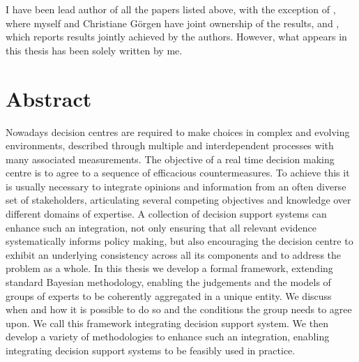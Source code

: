 \documentclass[11pt, oneside]{Thesis} %
\begin{document}
I have been lead author of all the papers listed above, with the exception of \citet{Gorgen2015}, where myself and Christiane G\"{o}rgen have joint ownership of the results, and \citet{Smith2015}, which reports results jointly achieved by the authors. However, what appears in this thesis has been solely written by me.   
\clearpage 

\chapter*{Abstract}
\thispagestyle{empty}
Nowadays decision centres are required to make choices in complex and evolving environments, described through multiple and interdependent processes with many associated measurements. The objective of a real time decision making centre is to agree to a sequence of efficacious countermeasures. To achieve this it is usually necessary to integrate opinions and information from an often diverse set of stakeholders, articulating several competing objectives and knowledge over different domains of expertise. A collection of decision support systems can enhance such an integration, not only ensuring that all relevant evidence systematically informs policy making, but also encouraging the decision centre to exhibit an underlying consistency across all its components and to address the problem as a whole. In this thesis we develop a formal framework, extending standard Bayesian methodology, enabling the judgements and the models of groups of experts to be coherently aggregated in a unique entity. We discuss when and how it is possible to do so and the conditions the group needs to agree upon. We call this framework integrating decision support system. We then develop a variety of methodologies to enhance such an integration, enabling integrating decision support systems to be feasibly used in practice.  
\end{document}
